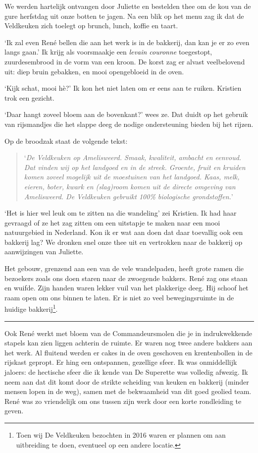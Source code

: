 \documentclass[
  11pt,
  dutch,
]{memoir}
\begin{document}
We werden hartelijk ontvangen door Juliette en bestelden thee om de kou
van de gure herfstdag uit onze botten te jagen. Na een blik op het menu
zag ik dat de Veldkeuken zich toelegt op brunch, lunch, koffie en taart.

`Ik zal even René bellen die aan het werk is in de bakkerij, dan kan je
er zo even langs gaan.' Ik krijg als voorsmaakje een \emph{levain
couronne} toegestopt, zuurdesembrood in de vorm van een kroon. De korst
zag er alvast veelbelovend uit: diep bruin gebakken, en mooi
opengebloeid in de oven.

`Kijk schat, mooi hè?' Ik kon het niet laten om er eens aan te ruiken.
Kristien trok een gezicht.

`Daar hangt zoveel bloem aan de bovenkant?' wees ze. Dat duidt op het
gebruik van rijsmandjes die het slappe deeg de nodige ondersteuning
bieden bij het rijzen.

Op de broodzak staat de volgende tekst:

\begin{quote}
`\emph{De Veldkeuken op Amelisweerd. Smaak, kwaliteit, ambacht en
eenvoud. Dat vinden wij op het landgoed en in de streek. Groente, fruit
en kruiden komen zoveel mogelijk uit de moestuinen van het landgoed.
Kaas, melk, eieren, boter, kwark en (slag)room komen uit de directe
omgeving van Amelisweerd. De Veldkeuken gebruikt 100\% biologische
grondstoffen.}'
\end{quote}

`Het is hier wel leuk om te zitten na die wandeling' zei Kristien. Ik
had haar gevraagd of ze het zag zitten om een uitstapje te maken naar
een mooi natuurgebied in Nederland. Kon ik er wat aan doen dat daar
toevallig ook een bakkerij lag? We dronken snel onze thee uit en
vertrokken naar de bakkerij op aanwijzingen van Juliette.

Het gebouw, grenzend aan een van de vele wandelpaden, heeft grote ramen
die bezoekers zoals ons doen staren naar de zwoegende bakkers. René zag
ons staan en wuifde. Zijn handen waren lekker vuil van het plakkerige
deeg. Hij schoof het raam open om ons binnen te laten. Er is niet zo
veel bewegingsruimte in de huidige bakkerij\footnote{Toen wij De
  Veldkeuken bezochten in 2016 waren er plannen om aan uitbreiding te
  doen, eventueel op een andere locatie.}.

\pfbreak

Ook René werkt met bloem van de Commandeursmolen die je in
indrukwekkende stapels kan zien liggen achterin de ruimte. Er waren nog
twee andere bakkers aan het werk. Al fluitend werden er cakes in de oven
geschoven en krentenbollen in de rijskast gepropt. Er hing een
ontspannen, gezellige sfeer. Ik was onmiddellijk jaloers: de hectische
sfeer die ik kende van De Superette was volledig afwezig. Ik neem aan
dat dit komt door de strikte scheiding van keuken en bakkerij (minder
mensen lopen in de weg), samen met de bekwaamheid van dit goed geolied
team. René was zo vriendelijk om ons tussen zijn werk door een korte
rondleiding te geven.
\end{document}
